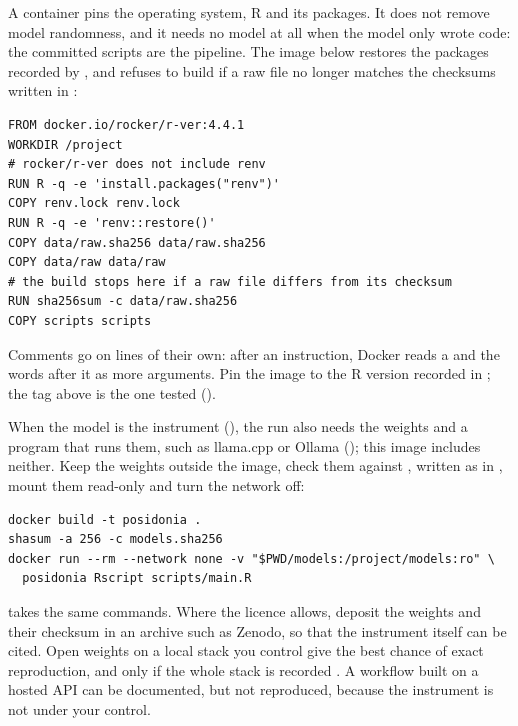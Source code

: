 A container pins the operating system, R and its packages. It does not remove
model randomness, and it needs no model at all when the model only wrote code:
the committed scripts are the pipeline. The image below restores the packages
recorded by , and refuses to build if a raw file no longer matches
the checksums written in :

\begin{lstlisting}[style=shell,caption={Dockerfile}]
FROM docker.io/rocker/r-ver:4.4.1
WORKDIR /project
# rocker/r-ver does not include renv
RUN R -q -e 'install.packages("renv")'
COPY renv.lock renv.lock
RUN R -q -e 'renv::restore()'
COPY data/raw.sha256 data/raw.sha256
COPY data/raw data/raw
# the build stops here if a raw file differs from its checksum
RUN sha256sum -c data/raw.sha256
COPY scripts scripts
\end{lstlisting}

Comments go on lines of their own: after an instruction, Docker reads a
\code{\#} and the words after it as more arguments. Pin the image to the R
version recorded in ; the tag above is the one tested
().

When the model is the instrument (), the run also needs
the weights and a program that runs them, such as llama.cpp or Ollama
(); this image includes neither. Keep the weights outside the
image, check them against , written as in
, mount them read-only and turn the network off:

\begin{lstlisting}[style=shell]
docker build -t posidonia .
shasum -a 256 -c models.sha256
docker run --rm --network none -v "$PWD/models:/project/models:ro" \
  posidonia Rscript scripts/main.R
\end{lstlisting}

 takes the same commands. Where the licence allows, deposit the
weights and their checksum in an archive such as Zenodo, so that the
instrument itself can be cited. Open weights on a local stack you control give
the best chance of exact reproduction, and only if the whole stack is recorded
\parencite{coqueret2026randomness}. A workflow built on a hosted API can be
documented, but not reproduced, because the instrument is not under your
control.
